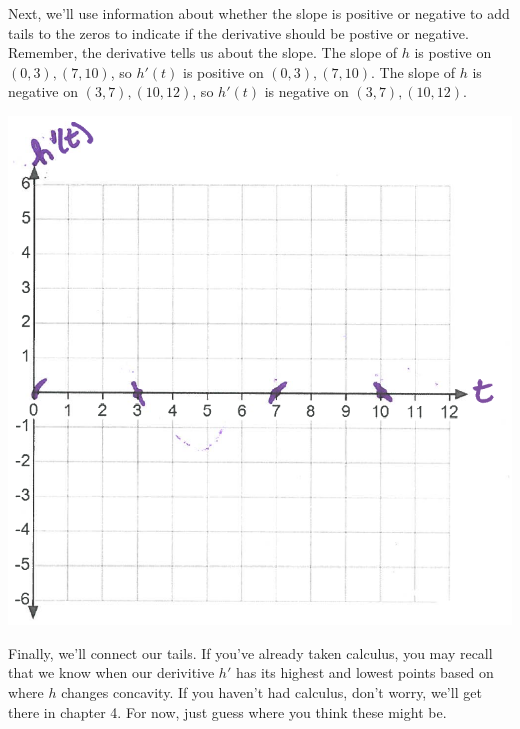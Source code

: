 \documentclass[nooutcomes]{ximera}
\begin{document}
\begin{problem}
\begin{enumerate}
\begin{freeResponse}
\begin{image}
			\end{image}
			Next, we'll use information about whether the slope is positive or negative to add tails to the zeros to indicate if the derivative should be postive or negative.  Remember, the derivative tells us about the slope. The slope of $h$ is postive on $(0,3),(7,10)$, so $h'(t)$ is positive on $(0,3),(7,10)$.  The slope of $h$ is negative on $(3,7),(10,12)$, so $h'(t)$ is negative on $(3,7),(10,12)$.
			\begin{image}
			\includegraphics[scale=.4]{Figure11.png}
			\end{image}
			Finally, we'll connect our tails.  If you've already taken calculus, you may recall that we know when our derivitive $h'$ has its highest and lowest points based on where $h$ changes concavity.  If you haven't had calculus, don't worry, we'll get there in chapter 4.  For now, just guess where you think these might be.
			\begin{image}

\end{image}
\end{freeResponse}
\end{enumerate}
\end{problem}
\end{document}
